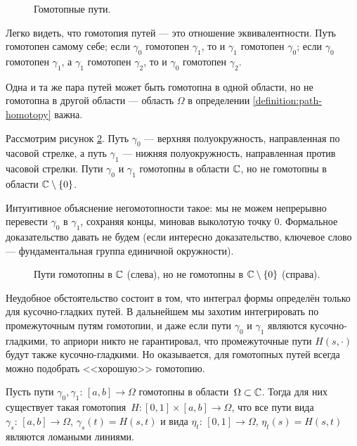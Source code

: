 \documentclass[../complex-analysis.tex]{subfiles}
\begin{document}
\begin{figure}[ht]
 \centering
 \caption{Гомотопные пути.}
 \label{fig:path-homptopy}
\end{figure}

\begin{remrk*}
 Легко видеть, что гомотопия путей --- это отношение эквивалентности. Путь гомотопен самому себе; если $ \gamma_0 $ гомотопен $ \gamma_1 $, то и $ \gamma_1 $ гомотопен $ \gamma_0 $; если $ \gamma_0 $ гомотопен $ \gamma_1 $, а $ \gamma_1 $ гомотопен $ \gamma_2 $, то и $ \gamma_0 $ гомотопен $ \gamma_2 $.
\end{remrk*}

\begin{exmpl}
 \label{example:non_homotopy_paths}
 Одна и та же пара путей может быть гомотопна в одной области, но не гомотопна в другой области --- область $\Omega$ в определении \ref{definition:path-homotopy} важна.

 Рассмотрим рисунок \ref{fig:paths-without-homptopy}. Путь $\gamma_0$ --- верхняя полуокружность, направленная по часовой стрелке, а путь $\gamma_1$ ---  нижняя полуокружность, направленная против часовой стрелки. Пути $\gamma_0$ и $\gamma_1$ гомотопны в области $\mathbb{C}$, но не гомотопны в области $\mathbb{C} \setminus \left\{ 0 \right\}$.

 Интуитивное объяснение негомотопности такое: мы не можем непрерывно перевести $\gamma_0$ в $\gamma_1$, сохраняя концы, миновав выколотую точку $0$. Формальное доказательство давать не будем (если интересно доказательство, ключевое слово --- фундаментальная группа единичной окружности).
\end{exmpl}

\begin{figure}[ht]
 \centering
 \caption{Пути гомотопны в $\mathbb{C}$ (слева), но не гомотопны в $\mathbb{C} \setminus \left\{ 0 \right\}$ (справа).}
 \label{fig:paths-without-homptopy}
\end{figure}

Неудобное обстоятельство состоит в том, что интеграл формы определён только для кусочно-гладких путей. В дальнейшем мы захотим интегрировать по промежуточным путям гомотопии, и даже если пути $ \gamma_0 $ и $ \gamma_1 $ являются кусочно-гладкими, то априори никто не гарантировал, что промежуточные пути $ H(s, \cdot) $ будут также кусочно-гладкими. Но оказывается, для гомотопных путей всегда можно подобрать <<хорошую>> гомотопию.

\begin{prop}
 \label{prop:piecewise_linear_homotopy}
 Пусть пути $ \gamma_0, \gamma_1 \colon\,[a,b] \to \Omega $ гомотопны в области~$ \Omega \subset \mathbb{C} $. Тогда для них существует такая гомотопия~$ H \colon [0,1] \times [a,b] \to \Omega $, что все пути вида $ \gamma_s \colon\, [a,b] \to \Omega $, $ \gamma_s(t) = H(s,t) $ и вида $ \eta_t \colon\, [0,1] \to \Omega $, $ \eta_t(s) = H(s,t) $ являются ломаными линиями.
\end{prop}
\end{document}
